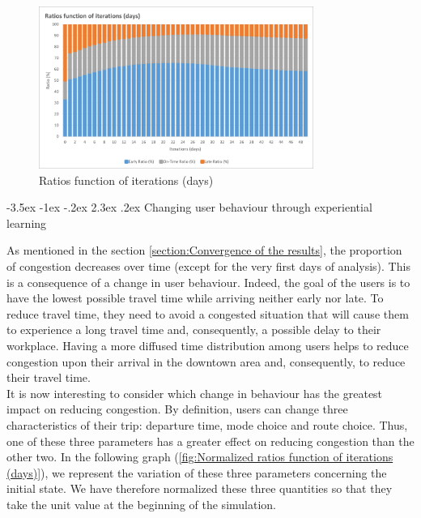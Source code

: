 \documentclass[a4paper, 12pt,oneside]{article}
\makeatletter
\renewcommand{\subsection}{\@startsection {subsection}{1}{\z@}%
             {-3.5ex \@plus -1ex \@minus -.2ex}%
             {2.3ex \@plus.2ex}%
             {\normalfont\normalsize\bfseries}}
\makeatother
\begin{document}
\begin{figure}[H]
    \centering
    \includegraphics[width=0.8\textwidth]{Images/Step2/Ratios_function_iterations.png}
    \caption{Ratios function of iterations (days)}
    \label{fig:Ratios function of iterations (days)}
\end{figure}



\subsection{Changing user behaviour through experiential learning}

As mentioned in the section \ref{section:Convergence of the results}, the proportion of congestion decreases over time (except for the very first days of analysis). This is a consequence of a change in user behaviour. Indeed, the goal of the users is to have the lowest possible travel time while arriving neither early nor late. To reduce travel time, they need to avoid a congested situation that will cause them to experience a long travel time and, consequently, a possible delay to their workplace. Having a more diffused time distribution among users helps to reduce congestion upon their arrival in the downtown area and, consequently, to reduce their travel time.\\

It is now interesting to consider which change in behaviour has the greatest impact on reducing congestion. By definition, users can change three characteristics of their trip: departure time, mode choice and route choice. Thus, one of these three parameters has a greater effect on reducing congestion than the other two. In the following graph (\ref{fig:Normalized ratios function of iterations (days)}), we represent the variation of these three parameters concerning the initial state. We have therefore normalized these three quantities so that they take the unit value at the beginning of the simulation.\\
\end{document}

